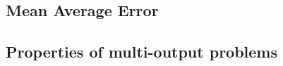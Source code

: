 \subsection{Mean Average Error}
\subsection{Properties of multi-output problems}
\label{sub:multi}

